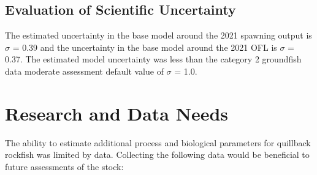 \documentclass[11pt,
  english,
  letterpaper,
]{article}
\begin{document}
\leavevmode\tagmcend\tagstructend\par


\hypertarget{evaluation-of-scientific-uncertainty}{%
\subsection{Evaluation of Scientific Uncertainty}\label{evaluation-of-scientific-uncertainty}}

\leavevmode\tagmcend\tagstructend


The estimated uncertainty in the base model around the 2021 spawning output is {\(\sigma\)\leavevmode\tagmcend\tagstructend} = 0.39 and the uncertainty in the base model around the 2021 OFL is {\(\sigma\)\leavevmode\tagmcend\tagstructend} = 0.37. The estimated model uncertainty was less than the category 2 groundfish data moderate assessment default value of {\(\sigma\)\leavevmode\tagmcend\tagstructend} = 1.0.

\leavevmode\tagmcend\tagstructend\par


\hypertarget{research-and-data-needs}{%
\section{Research and Data Needs}\label{research-and-data-needs}}

\leavevmode\tagmcend\tagstructend


The ability to estimate additional process and biological parameters for quillback rockfish was limited by data. Collecting the following data would be beneficial to future assessments of the stock:

\leavevmode\tagmcend\tagstructend\par
\end{document}
